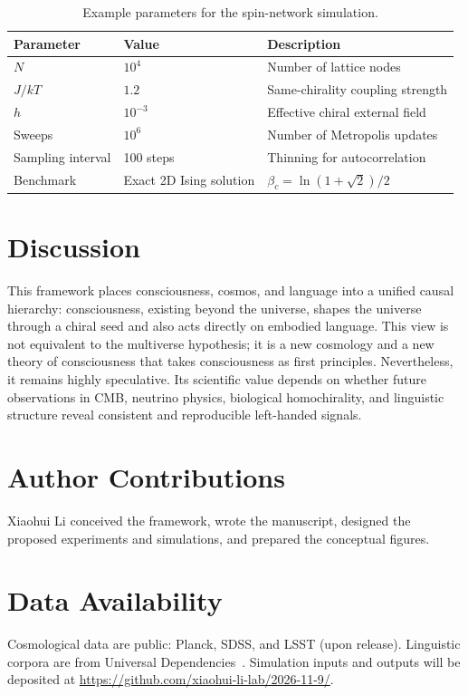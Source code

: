 \documentclass[10pt,a4paper]{article}
\begin{document}
\begin{table}[htbp]
\centering
\caption{Example parameters for the spin-network simulation.}
\begin{tabular}{@{}lll@{}}
\toprule
\textbf{Parameter} & \textbf{Value} & \textbf{Description} \\ \midrule
$N$ & $10^4$ & Number of lattice nodes \\
$J/kT$ & $1.2$ & Same-chirality coupling strength \\
$h$ & $10^{-3}$ & Effective chiral external field \\
Sweeps & $10^6$ & Number of Metropolis updates \\
Sampling interval & 100 steps & Thinning for autocorrelation \\
Benchmark & Exact 2D Ising solution & $\beta_c=\ln(1+\sqrt{2})/2$ \\ \bottomrule
\end{tabular}
\label{tab:params}
\end{table}

\section*{Discussion}
This framework places consciousness, cosmos, and language into a unified causal hierarchy: consciousness, existing beyond the universe, shapes the universe through a chiral seed and also acts directly on embodied language. This view is not equivalent to the multiverse hypothesis; it is a new cosmology and a new theory of consciousness that takes consciousness as first principles. Nevertheless, it remains highly speculative. Its scientific value depends on whether future observations in CMB, neutrino physics, biological homochirality, and linguistic structure reveal consistent and reproducible left-handed signals.

\section*{Author Contributions}
Xiaohui Li conceived the framework, wrote the manuscript, designed the proposed experiments and simulations, and prepared the conceptual figures.

\section*{Data Availability}
Cosmological data are public: Planck, SDSS, and LSST (upon release). Linguistic corpora are from Universal Dependencies~\cite{UD}. Simulation inputs and outputs will be deposited at \url{https://github.com/xiaohui-li-lab/2026-11-9/}.
\end{document}
